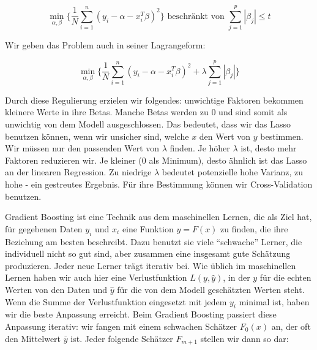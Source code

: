 \documentclass[12pt,a4paper,twoside]{scrartcl}
\numberwithin{equation}{section}
\newcounter{subsubsubsection}[subsubsection]
\begin{document}
\begin{equation}\label{eq:2.23}
	 \min_{\alpha, \beta} \bigg\{ \frac{1}{N}\sum_{i=1}^{n} (y_i - \alpha - x_i^T\beta)^2 \bigg\} \text{ beschränkt von } \sum_{j=1}^{p} |\beta_j| \leq t
\end{equation}  

\noindent
Wir geben das Problem auch in seiner Lagrangeform:\par 

\begin{equation}\label{eq:2.24}
	 \min_{\alpha, \beta} \bigg\{ \frac{1}{N}\sum_{i=1}^{n} (y_i - \alpha - x_i^T\beta)^2 + \lambda  \sum_{j=1}^{p} |\beta_j| \bigg\}
\end{equation} 

\noindent
Durch diese Regulierung erzielen wir folgendes: unwichtige Faktoren bekommen kleinere Werte in ihre Betas. Manche Betas werden zu $0$ und sind somit als unwichtig von dem Modell ausgeschlossen. Das bedeutet, dass wir das Lasso benutzen können, wenn wir unsicher sind, welche $x$ den Wert von $y$ bestimmen\cite{tibshirani1996regression}. Wir müssen nur den passenden Wert von $\lambda$ finden. Je höher $\lambda$ ist, desto mehr Faktoren reduzieren wir. Je kleiner ($0$ als Minimum), desto ähnlich ist das Lasso an der linearen Regression.  Zu niedrige $\lambda$ bedeutet potenzielle hohe Varianz, zu hohe - ein gestreutes Ergebnis. Für ihre Bestimmung können wir Cross-Validation benutzen\cite{tibshirani1996regression}.\par 

\label{subsubsubsec:gradientBoosting}

Gradient Boosting ist eine Technik aus dem maschinellen Lernen, die als Ziel hat, für gegebenen Daten $y_i$ und $x_i$ eine Funktion $y=F(x)$ zu finden, die ihre Beziehung am besten beschreibt. Dazu benutzt sie viele \enquote{schwache} Lerner, die individuell nicht so gut sind, aber zusammen eine insgesamt gute Schätzung produzieren. Jeder neue Lerner trägt iterativ bei. Wie üblich im maschinellen Lernen haben wir auch hier eine Verlustfunktion $L(y,\hat y)$, in der $y$ für die echten Werten von den Daten und $\hat y$ für die von dem Modell geschätzten Werten steht. Wenn die Summe der Verlustfunktion eingesetzt mit jedem $y_i$ minimal ist, haben wir die beste Anpassung erreicht. Beim Gradient Boosting passiert diese Anpassung iterativ: wir fangen mit einem schwachen Schätzer $F_0(x)$ an, der oft den Mittelwert $\overline{y}$ ist\cite{gradientBoost}. Jeder folgende Schätzer $F_{m+1}$ stellen wir dann so dar:\par
\end{document}
